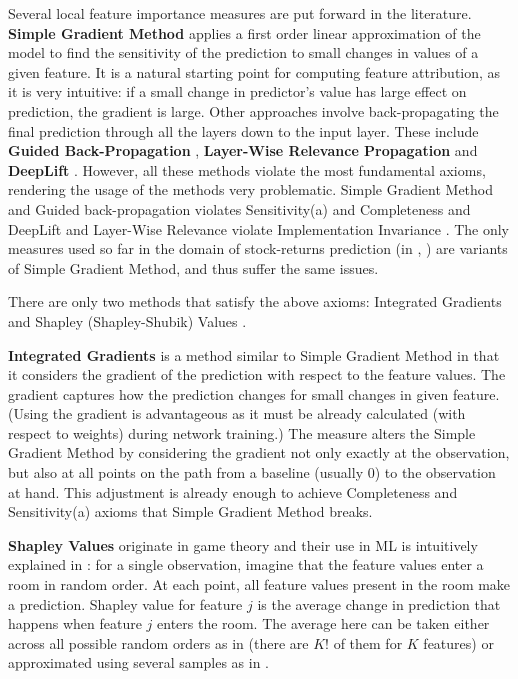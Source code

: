 			Several local feature importance measures are put forward in the literature. \textbf{Simple Gradient Method} \citep{baehrens2010explain} applies a first order linear approximation of the model to find the sensitivity of the prediction to small changes in values of a given feature. It is a natural starting point for computing feature attribution, as it is very intuitive: if a small change in predictor's value has large effect on prediction, the gradient is large. Other approaches involve back-propagating the final prediction through all the layers down to the input layer. These include  \textbf{Guided Back-Propagation} \citep{springenberg2014striving}, \textbf{Layer-Wise Relevance Propagation} \citep{binder2016layer} and \textbf{DeepLift} \citep{shrikumar2017learning}. However, all these methods violate the most fundamental axioms, rendering the usage of the methods very problematic. Simple Gradient Method and Guided back-propagation violates Sensitivity(a) and Completeness and DeepLift and Layer-Wise Relevance violate Implementation Invariance \citep{shrikumar2017learning, sundararajan2017axiomatic}. The only measures used so far in the domain of stock-returns prediction (in \cite{gu2020empirical}, \cite{tobek2020does}) are variants of Simple Gradient Method, and thus suffer the same issues. 
			
			There are only two methods that satisfy the above axioms: Integrated Gradients \citep{sundararajan2017axiomatic} and Shapley (Shapley-Shubik) Values \citep{shapley1971assignment}. 	
			
			\textbf{ Integrated Gradients} \citep{sundararajan2017axiomatic} is a method similar to Simple Gradient Method in that it considers the gradient of the prediction with respect to the feature values. The gradient captures how the prediction changes for small changes in given feature. (Using the gradient is advantageous as it must be already calculated (with respect to weights) during network training.) The measure alters the Simple Gradient Method by considering the gradient not only exactly at the observation, but also at all points on the path from a baseline (usually $0$) to the observation at hand. This adjustment is already enough to achieve Completeness and Sensitivity(a) axioms that Simple Gradient Method breaks. 
			
			\textbf{Shapley Values} originate in game theory and their use in ML is intuitively explained in \cite{molnar2020interpretable}: for a single observation, imagine that the feature values enter a room in random order. At each point, all feature values present in the room make a prediction. Shapley value for feature $j$ is the average change in prediction that happens when feature $j$ enters the room. The average here can be taken either across all possible random orders as in \cite{shapley1971assignment} (there are $K!$ of them for $K$ features) or approximated using several samples as in \cite{vstrumbelj2014explaining}. 
			
